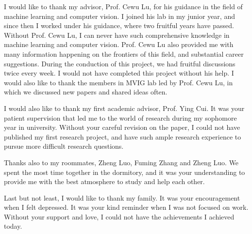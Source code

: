 \begin{thanks}

I would like to thank my advisor, Prof. Cewu Lu, for his guidance in the field of machine learning and computer vision. I joined his lab in my junior year, and since then I worked under his guidance, where two fruitful years have passed. Without Prof. Cewu Lu, I can never have such comprehensive knowledge in machine learning and computer vision. Prof. Cewu Lu also provided me with many information happening on the frontiers of this field, and substantial career suggestions. During the conduction of this project, we had fruitful discussions twice every week. I would not have completed this project without his help. I would also like to thank the members in MVIG lab led by Prof. Cewu Lu, in which we discussed new papers and shared ideas often.

I would also like to thank my first academic advisor, Prof. Ying Cui. It was your patient supervision that led me to the world of research during my sophomore year in university. Without your careful revision on the paper, I could not have published my first research project, and have such ample research experience to pursue more difficult research questions.

Thanks also to my roommates, Zheng Luo, Fuming Zhang and Zheng Luo. We spent the most time together in the dormitory, and it was your understanding to provide me with the best atmosphere to study and help each other.

Last but not least, I would like to thank my family. It was your encouragement when I felt depressed. It was your kind reminder when I was not focused on work. Without your support and love, I could not have the achievements I achieved today.

\end{thanks}
